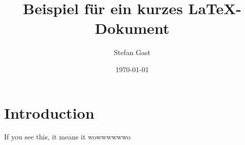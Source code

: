\documentclass{scrartcl}
\title{Beispiel für ein kurzes \LaTeX-Dokument}
\author{Stefan Gast}
\date{\today}
\begin{document}


	\section{Introduction}
		If you see this, it means it wowwwwwwo
	
\end{document}
